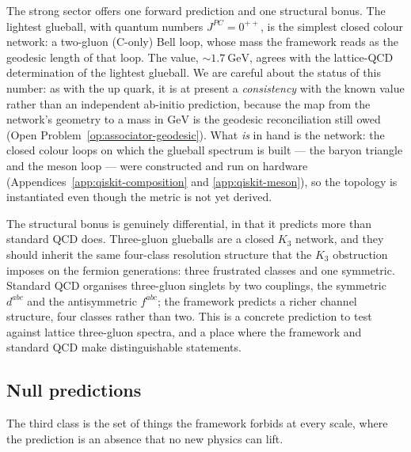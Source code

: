 The strong sector offers one forward prediction and one structural bonus. The lightest glueball, with
quantum numbers $J^{PC} = 0^{++}$, is the simplest closed colour network: a two-gluon
($\mathrm{C}$-only) Bell loop, whose mass the framework reads as the geodesic length of that loop.
The value, $\sim 1.7\ \mathrm{GeV}$, agrees with the lattice-QCD determination of the lightest
glueball. We are careful about the status of this number: as with the up quark, it is at present a
\emph{consistency} with the known value rather than an independent ab-initio prediction, because the
map from the network's geometry to a mass in $\mathrm{GeV}$ is the geodesic reconciliation still owed
(Open Problem~\ref{op:associator-geodesic}). What \emph{is} in hand is the network: the closed colour
loops on which the glueball spectrum is built --- the baryon triangle and the meson loop --- were
constructed and run on hardware (Appendices~\ref{app:qiskit-composition} and \ref{app:qiskit-meson}),
so the topology is instantiated even though the metric is not yet derived.

The structural bonus is genuinely differential, in that it predicts more than standard QCD does.
Three-gluon glueballs are a closed $K_3$ network, and they should inherit the same four-class
resolution structure that the $K_3$ obstruction imposes on the fermion generations: three frustrated
classes and one symmetric. Standard QCD organises three-gluon singlets by two couplings, the
symmetric $d^{abc}$ and the antisymmetric $f^{abc}$; the framework predicts a richer channel
structure, four classes rather than two. This is a concrete prediction to test against lattice
three-gluon spectra, and a place where the framework and standard QCD make distinguishable
statements.

\subsection{Null predictions}

The third class is the set of things the framework forbids at every scale, where the prediction is an
absence that no new physics can lift.

